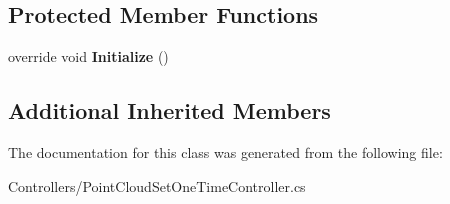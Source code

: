 \subsection*{Protected Member Functions}
\begin{DoxyCompactItemize}
\item 
\mbox{\label{class_controllers_1_1_point_cloud_set_one_time_controller_a36b5907637583779902ab0ab8307c441}} 
override void {\bfseries Initialize} ()
\end{DoxyCompactItemize}
\subsection*{Additional Inherited Members}


The documentation for this class was generated from the following file\+:\begin{DoxyCompactItemize}
\item 
Controllers/Point\+Cloud\+Set\+One\+Time\+Controller.\+cs\end{DoxyCompactItemize}
